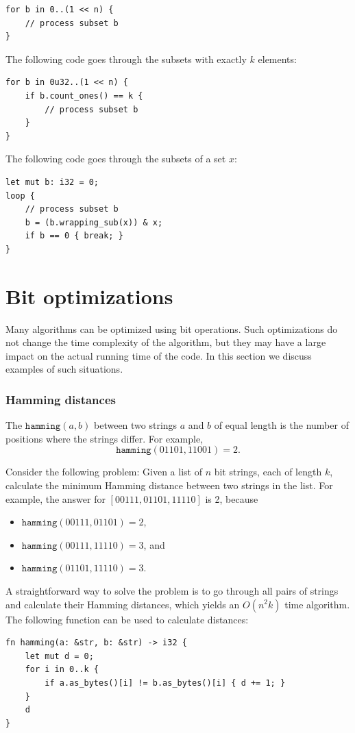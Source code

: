 \begin{lstlisting}
for b in 0..(1 << n) {
    // process subset b
}
\end{lstlisting}
The following code goes through
the subsets with exactly $k$ elements:
\begin{lstlisting}
for b in 0u32..(1 << n) {
    if b.count_ones() == k {
        // process subset b
    }
}
\end{lstlisting}
The following code goes through the subsets
of a set $x$:
\begin{lstlisting}
let mut b: i32 = 0;
loop {
    // process subset b
    b = (b.wrapping_sub(x)) & x;
    if b == 0 { break; }
}
\end{lstlisting}

\section{Bit optimizations}

Many algorithms can be optimized using
bit operations.
Such optimizations do not change the
time complexity of the algorithm,
but they may have a large impact
on the actual running time of the code.
In this section we discuss examples
of such situations.

\subsubsection{Hamming distances}

The 
$\texttt{hamming}(a,b)$ between two
strings $a$ and $b$ of equal length is
the number of positions where the strings differ.
For example,
\[\texttt{hamming}(01101,11001)=2.\]

Consider the following problem: Given
a list of $n$ bit strings, each of length $k$,
calculate the minimum Hamming distance
between two strings in the list.
For example, the answer for $[00111,01101,11110]$
is 2, because
\begin{itemize}[noitemsep]
\item $\texttt{hamming}(00111,01101)=2$,
\item $\texttt{hamming}(00111,11110)=3$, and
\item $\texttt{hamming}(01101,11110)=3$.
\end{itemize}

A straightforward way to solve the problem is
to go through all pairs of strings and calculate
their Hamming distances,
which yields an $O(n^2 k)$ time algorithm.
The following function can be used to
calculate distances:
\begin{lstlisting}
fn hamming(a: &str, b: &str) -> i32 {
    let mut d = 0;
    for i in 0..k {
        if a.as_bytes()[i] != b.as_bytes()[i] { d += 1; }
    }
    d
}
\end{lstlisting}

